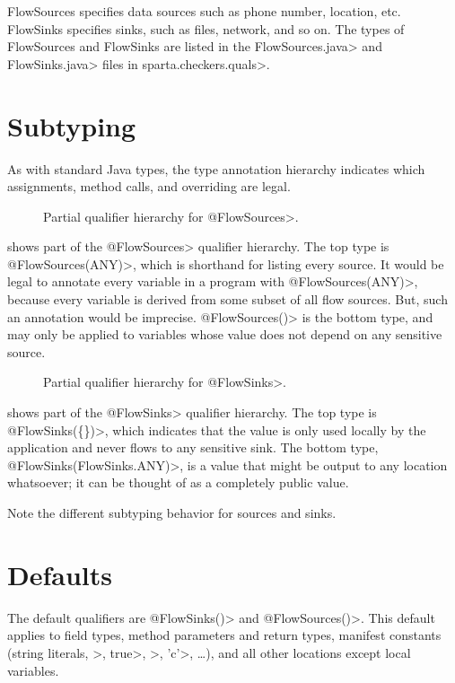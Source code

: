 FlowSources specifies data sources such as phone number, location, 
etc.  FlowSinks specifies sinks, such as files, network, and so on.
The types of FlowSources and FlowSinks are listed in the
\<FlowSources.java> and \<FlowSinks.java> files in \<sparta.checkers.quals>.


\section{Subtyping}

As with standard Java types, the type annotation hierarchy indicates which
assignments, method calls, and overriding are legal.


\begin{figure}
\caption{Partial qualifier hierarchy for \<@FlowSources>.}
\label{fig:flowsources-hierarchy}
\end{figure}

 shows part of the \<@FlowSources>
qualifier hierarchy.  The top type is \<@FlowSources(ANY)>, which is
shorthand for listing every source.  It would be legal to annotate every
variable in a program with \<@FlowSources(ANY)>, because every variable is
derived from some subset of all flow sources.  But, such an annotation
would be imprecise.  \<@FlowSources({})> is the bottom type, and may only
be applied to variables whose value does not depend on any sensitive
source.


\begin{figure}
\caption{Partial qualifier hierarchy for \<@FlowSinks>.}
\label{fig:flowsinks-hierarchy}
\end{figure}

 shows part of the \<@FlowSinks>
qualifier hierarchy.  The top type is \<@FlowSinks(\{\})>, which indicates
that the value is only used locally by the application and never flows to
any sensitive sink.  The bottom type, \<@FlowSinks(FlowSinks.ANY)>, is a
value that might be output to any location whatsoever; it can be thought of
as a completely public value.

Note the different subtyping behavior for sources and sinks.


\section{Defaults\label{flow-defaults}}

The default qualifiers are \<@FlowSinks({})> and \<@FlowSources({})>.  This
default applies to field types, method parameters and return types,
manifest constants
(string literals, >, \<true>, >, \<'c'>,
\ldots), and all other locations except local variables.

